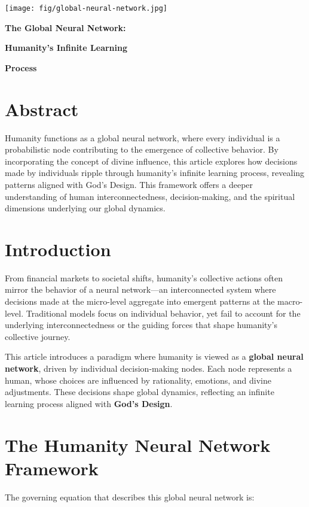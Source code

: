 \documentclass[a4]{article}
\newcommand{\bn}{\bigskip\noindent}
\newcommand{\mn}{\medskip\noindent}
\begin{document}
\begin{center}
\texttt{[image: fig/global-neural-network.jpg]}
\end{center}

\mn
{\huge\bf The Global Neural Network:}

\bn
{\huge\bf Humanity's Infinite Learning}

\bn
{\huge\bf Process}

\bn
\section*{Abstract}

Humanity functions as a global neural network, where every individual is a probabilistic node contributing to the emergence of collective behavior. By incorporating the concept of divine influence, this article explores how decisions made by individuals ripple through humanity's infinite learning process, revealing patterns aligned with God's Design. This framework offers a deeper understanding of human interconnectedness, decision-making, and the spiritual dimensions underlying our global dynamics.



\section{Introduction}  
From financial markets to societal shifts, humanity's collective actions often mirror the behavior of a neural network---an interconnected system where decisions made at the micro-level aggregate into emergent patterns at the macro-level. Traditional models focus on individual behavior, yet fail to account for the underlying interconnectedness or the guiding forces that shape humanity's collective journey.  

\bn
This article introduces a paradigm where humanity is viewed as a {\bf global neural network}, driven by individual decision-making nodes. Each node represents a human, whose choices are influenced by rationality, emotions, and divine adjustments. These decisions shape global dynamics, reflecting an infinite learning process aligned with {\bf God's Design}.


\section{The Humanity Neural Network Framework}

The governing equation that describes this global neural network is:  
\end{document}
